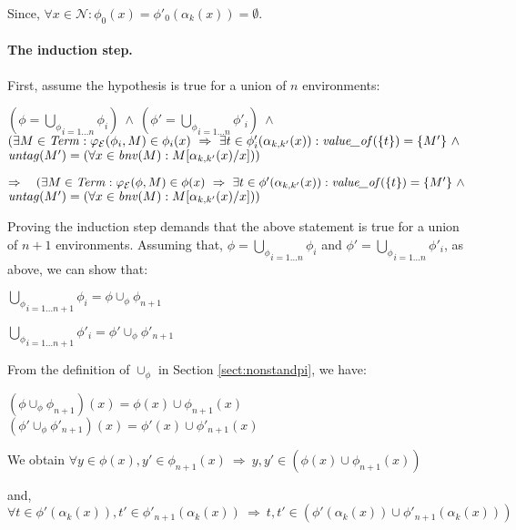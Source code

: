\documentclass[10pt,a4paper,final,oneside,fleqn]{book}
\begin{document}
\noindent
Since, $\forall x\in\mathcal{N}:\phi_0(x)=\phi'_0(\alpha_k(x))=\emptyset$.

\paragraph{The induction step.}
First, assume the hypothesis is true for a union of $n$ environments:

\noindent
$(\phi=\underset{i=1\ldots n}{\bigcup_\phi}\phi_i)~\wedge~(\phi'=\underset{i=1\ldots n}{\bigcup_\phi}\phi'_i)~\wedge$\\
$(\exists M\in\mbox{{\itshape Term\/}}:\varphi_\mathcal{E}(\phi_i,M)\in\phi_i(x)~\Rightarrow~\exists t\in\phi'_i(\alpha_{k,k'}(x)):\mbox{{\itshape value\_of\/}}(\{t\})=\{M'\}~\wedge$\\
$\mbox{{\itshape untag\/}}(M')=(\forall x\in\mbox{{\itshape bnv\/}}(M):M[\alpha_{k,k'}(x)/x]))$\vspace{5mm}

\noindent
$\Rightarrow~~~(\exists M\in\mbox{{\itshape Term\/}}:\varphi_\mathcal{E}(\phi,M)\in\phi(x)~\Rightarrow~\exists t\in\phi'(\alpha_{k,k'}(x)):\mbox{{\itshape value\_of\/}}(\{t\})=\{M'\}~\wedge$\\
$\mbox{{\itshape untag\/}}(M')=(\forall x\in\mbox{{\itshape bnv\/}}(M):M[\alpha_{k,k'}(x)/x]))$\vspace{5mm}

\noindent
Proving the induction step demands that the above statement is true for a union of $n+1$ environments.  Assuming that, $\phi=\underset{i=1\ldots n}{\bigcup_\phi}\phi_i$ and $\phi'=\underset{i=1\ldots n}{\bigcup_\phi}\phi'_i$, as above, we can show that:

\noindent
$\underset{i=1\ldots {n+1}}{\bigcup_\phi}\phi_i=\phi\cup_\phi\phi_{n+1}$

\noindent
$\underset{i=1\ldots {n+1}}{\bigcup_\phi}\phi'_i=\phi'\cup_\phi\phi'_{n+1}$\vspace{5mm}

\noindent
From the definition of $\cup_\phi$ in Section \ref{sect:nonstandpi}, we have:

\noindent
$(\phi\cup_\phi\phi_{n+1})(x)=\phi(x)\cup\phi_{n+1}(x)$\\
$(\phi'\cup_\phi\phi'_{n+1})(x)=\phi'(x)\cup\phi'_{n+1}(x)$\vspace{5mm}

\noindent
We obtain $\forall y\in\phi(x),y'\in\phi_{n+1}(x)~\Rightarrow~y,y'\in(\phi(x)\cup\phi_{n+1}(x))$

\noindent
and, $\forall t\in\phi'(\alpha_k(x)),t'\in\phi'_{n+1}(\alpha_k(x))~\Rightarrow~t,t'\in(\phi'(\alpha_k(x))\cup\phi'_{n+1}(\alpha_k(x)))$\vspace{5mm}
\end{document}
